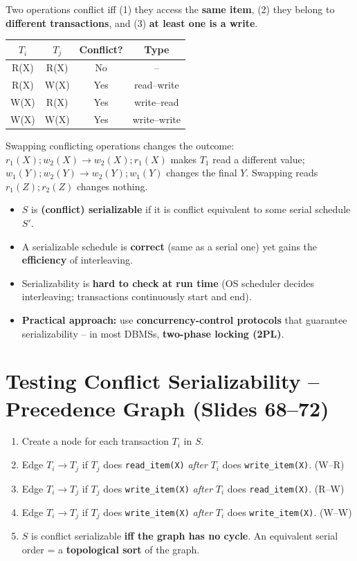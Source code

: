 \documentclass[10pt,a4paper]{article}
\newcommand{\op}[1]{\texttt{#1}}
\begin{document}
\begin{keybox}
Two operations conflict iff (1) they access the \textbf{same item}, (2) they belong to \textbf{different transactions}, and (3) \textbf{at least one is a write}.\\
\par\centering
\begin{tabular}{cccc}
\toprule
$T_i$ & $T_j$ & Conflict? & Type\\\midrule
R(X) & R(X) & No & --\\
R(X) & W(X) & Yes & read--write\\
W(X) & R(X) & Yes & write--read\\
W(X) & W(X) & Yes & write--write\\
\bottomrule
\end{tabular}
\end{keybox}
Swapping conflicting operations changes the outcome: $r_1(X);w_2(X)\to w_2(X);r_1(X)$ makes $T_1$ read a different value; $w_1(Y);w_2(Y)\to w_2(Y);w_1(Y)$ changes the final $Y$. Swapping reads $r_1(Z);r_2(Z)$ changes nothing.

\begin{itemize}
  \item $S$ is \textbf{(conflict) serializable} if it is conflict equivalent to some serial schedule $S'$.
  \item A serializable schedule is \textbf{correct} (same as a serial one) yet gains the \textbf{efficiency} of interleaving.
  \item Serializability is \textbf{hard to check at run time} (OS scheduler decides interleaving; transactions continuously start and end).
  \item \textbf{Practical approach:} use \textbf{concurrency-control protocols} that guarantee serializability -- in most DBMSs, \textbf{two-phase locking (2PL)}.
\end{itemize}

\section{Testing Conflict Serializability -- Precedence Graph (Slides 68--72)}

\begin{keybox}[Algorithm 21.1]
\begin{enumerate}
  \item Create a node for each transaction $T_i$ in $S$.
  \item Edge $T_i\to T_j$ if $T_j$ does \op{read\_item(X)} \emph{after} $T_i$ does \op{write\_item(X)}. \hfill (W--R)
  \item Edge $T_i\to T_j$ if $T_j$ does \op{write\_item(X)} \emph{after} $T_i$ does \op{read\_item(X)}. \hfill (R--W)
  \item Edge $T_i\to T_j$ if $T_j$ does \op{write\_item(X)} \emph{after} $T_i$ does \op{write\_item(X)}. \hfill (W--W)
  \item $S$ is conflict serializable \textbf{iff the graph has no cycle}. An equivalent serial order = a \textbf{topological sort} of the graph.
\end{enumerate}
\end{keybox}
\end{document}
